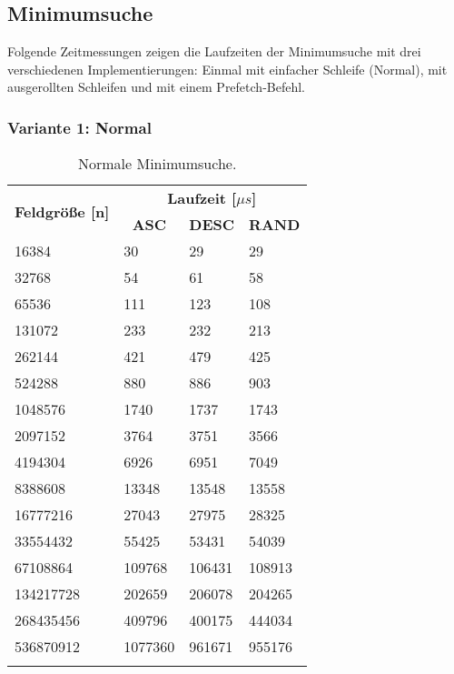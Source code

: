 \subsection{Minimumsuche}

Folgende Zeitmessungen zeigen die Laufzeiten der Minimumsuche mit drei verschiedenen Implementierungen: Einmal mit einfacher Schleife (Normal), mit ausgerollten Schleifen und mit einem Prefetch-Befehl.

\subsubsection{Variante 1: Normal}

\begin{center}
	\begin{longtable}{|p{5cm}|p{3cm}|p{3cm}|p{3cm}|}
		\hline
		
		\multirow{2}{5cm}{\centering \textbf{Feldgröße [n]}} & \multicolumn{3}{|c|}{ \textbf{Laufzeit [$\mu s$]}} \\\cline{2-4}
		& \multicolumn{1}{|c|}{\textbf{ASC}} & \multicolumn{1}{|c|}{\textbf{DESC}} &\multicolumn{1}{|c|}{\textbf{RAND}} \\
		\hhline{|=|=|=|=|}
		
		16384 & 30 & 29 & 29\\
		\hline
		32768 & 54 & 61 & 58\\
		\hline
		65536 & 111 & 123 & 108\\
		\hline
		131072 & 233 & 232 & 213\\
		\hline
		262144 & 421 & 479 & 425\\
		\hline
		524288 & 880 & 886 & 903\\
		\hline
		1048576 & 1740 & 1737 & 1743\\
		\hline
		2097152 & 3764 & 3751 & 3566\\
		\hline
		4194304 & 6926 & 6951 & 7049\\
		\hline
		8388608 & 13348 & 13548 & 13558\\
		\hline
		16777216 & 27043 & 27975 & 28325\\
		\hline
		33554432 & 55425 & 53431 & 54039\\
		\hline
		67108864 & 109768 & 106431 & 108913\\
		\hline
		134217728 & 202659 & 206078 & 204265\\
		\hline
		268435456 & 409796 & 400175 & 444034\\
		\hline
		536870912 & 1077360 & 961671 & 955176\\
		\hline
		
		\caption{Normale Minimumsuche.}
		\label{tab:minimumsearch-v1}
	\end{longtable}
\end{center}

